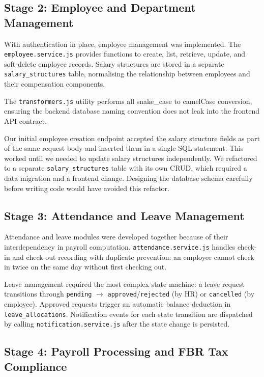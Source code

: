 \documentclass[12pt,a4paper]{report}
\begin{document}
\subsection{Stage 2: Employee and Department Management}

With authentication in place, employee management was implemented. The \texttt{employee.service.js} provides functions to create, list, retrieve, update, and soft-delete employee records. Salary structures are stored in a separate \texttt{salary\_structures} table, normalising the relationship between employees and their compensation components.

The \texttt{transformers.js} utility performs all snake\_case to camelCase conversion, ensuring the backend database naming convention does not leak into the frontend API contract.

\begin{failbox}
Our initial employee creation endpoint accepted the salary structure fields as part of the same request body and inserted them in a single SQL statement. This worked until we needed to update salary structures independently. We refactored to a separate \texttt{salary\_structures} table with its own CRUD, which required a data migration and a frontend change. Designing the database schema carefully before writing code would have avoided this refactor.
\end{failbox}

\subsection{Stage 3: Attendance and Leave Management}

Attendance and leave modules were developed together because of their interdependency in payroll computation. \texttt{attendance.service.js} handles check-in and check-out recording with duplicate prevention: an employee cannot check in twice on the same day without first checking out.

Leave management required the most complex state machine: a leave request transitions through \texttt{pending} $\to$ \texttt{approved}/\texttt{rejected} (by HR) or \texttt{cancelled} (by employee). Approved requests trigger an automatic balance deduction in \texttt{leave\_allocations}. Notification events for each state transition are dispatched by calling \texttt{notification.service.js} after the state change is persisted.

\subsection{Stage 4: Payroll Processing and FBR Tax Compliance}
\end{document}

